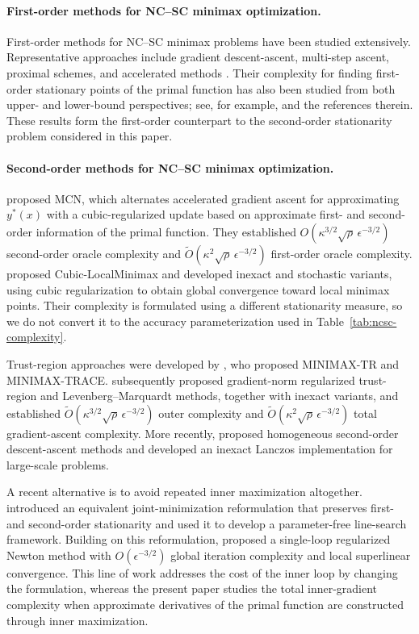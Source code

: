 \paragraph{First-order methods for NC--SC minimax optimization.}
First-order methods for NC--SC minimax problems have been studied
extensively. Representative approaches include gradient
descent-ascent, multi-step ascent, proximal schemes, and accelerated
methods
\citep{nouiehed2019solving,lin2020gradient,lin2020near}.
Their complexity for finding first-order stationary points of the
primal function has also been studied from both upper- and lower-bound
perspectives; see, for example, \citet{zhang2021complexity} and the
references therein. These results form the first-order counterpart to
the second-order stationarity problem considered in this paper.

\paragraph{Second-order methods for NC--SC minimax optimization.}
\citet{luo2022finding} proposed MCN, which alternates accelerated
gradient ascent for approximating $y^*(x)$ with a cubic-regularized
update based on approximate first- and second-order information of the
primal function. They established
$O(\kappa^{3/2}\sqrt{\rho}\,\epsilon^{-3/2})$ second-order oracle
complexity and
$\widetilde O(\kappa^2\sqrt{\rho}\,\epsilon^{-3/2})$ first-order oracle
complexity.
\citet{chen2023cubic} proposed Cubic-LocalMinimax and developed
inexact and stochastic variants, using cubic regularization to obtain
global convergence toward local minimax points. Their complexity is
formulated using a different stationarity measure, so we do not
convert it to the accuracy parameterization used in
Table~\ref{tab:ncsc-complexity}.

Trust-region approaches were developed by \citet{yao2025trust}, who
proposed MINIMAX-TR and MINIMAX-TRACE.
\citet{wang2025gradient} subsequently proposed gradient-norm
regularized trust-region and Levenberg--Marquardt methods, together
with inexact variants, and established
$\widetilde O(\kappa^{3/2}\sqrt{\rho}\,\epsilon^{-3/2})$ outer
complexity and
$\widetilde O(\kappa^2\sqrt{\rho}\,\epsilon^{-3/2})$ total
gradient-ascent complexity.
More recently, \citet{chen2026hsda} proposed homogeneous second-order
descent-ascent methods and developed an inexact Lanczos implementation
for large-scale problems.

A recent alternative is to avoid repeated inner maximization
altogether. \citet{ma2026linesearch} introduced an equivalent
joint-minimization reformulation that preserves first- and
second-order stationarity and used it to develop a parameter-free
line-search framework. Building on this reformulation,
\citet{ma2026singleloop} proposed a single-loop regularized Newton
method with $O(\epsilon^{-3/2})$ global iteration complexity and local
superlinear convergence. This line of work addresses the cost of the
inner loop by changing the formulation, whereas the present paper
studies the total inner-gradient complexity when approximate
derivatives of the primal function are constructed through inner
maximization.

